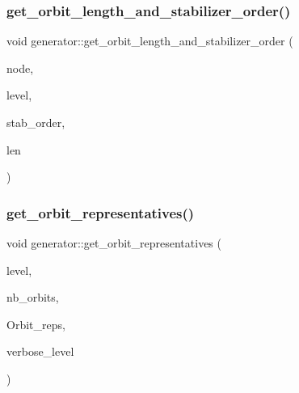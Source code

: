 \mbox{\label{classgenerator_a3b61656a33d833f30f2ac88406186a36}} 
\subsubsection{\texorpdfstring{get\+\_\+orbit\+\_\+length\+\_\+and\+\_\+stabilizer\+\_\+order()}{get\_orbit\_length\_and\_stabilizer\_order()}}
{\footnotesize\ttfamily void generator\+::get\+\_\+orbit\+\_\+length\+\_\+and\+\_\+stabilizer\+\_\+order (\begin{DoxyParamCaption}\item[{\mbox{\hyperlink{galois_8h_a09fddde158a3a20bd2dcadb609de11dc}{I\+NT}}}]{node,  }\item[{\mbox{\hyperlink{galois_8h_a09fddde158a3a20bd2dcadb609de11dc}{I\+NT}}}]{level,  }\item[{\mbox{\hyperlink{classlonginteger__object}{longinteger\+\_\+object}} \&}]{stab\+\_\+order,  }\item[{\mbox{\hyperlink{classlonginteger__object}{longinteger\+\_\+object}} \&}]{len }\end{DoxyParamCaption})}

\mbox{\label{classgenerator_a10b4d5109d52d78991b71870c32e4bcd}} 
\subsubsection{\texorpdfstring{get\+\_\+orbit\+\_\+representatives()}{get\_orbit\_representatives()}}
{\footnotesize\ttfamily void generator\+::get\+\_\+orbit\+\_\+representatives (\begin{DoxyParamCaption}\item[{\mbox{\hyperlink{galois_8h_a09fddde158a3a20bd2dcadb609de11dc}{I\+NT}}}]{level,  }\item[{\mbox{\hyperlink{galois_8h_a09fddde158a3a20bd2dcadb609de11dc}{I\+NT}} \&}]{nb\+\_\+orbits,  }\item[{\mbox{\hyperlink{galois_8h_a09fddde158a3a20bd2dcadb609de11dc}{I\+NT}} $\ast$\&}]{Orbit\+\_\+reps,  }\item[{\mbox{\hyperlink{galois_8h_a09fddde158a3a20bd2dcadb609de11dc}{I\+NT}}}]{verbose\+\_\+level }\end{DoxyParamCaption})}

